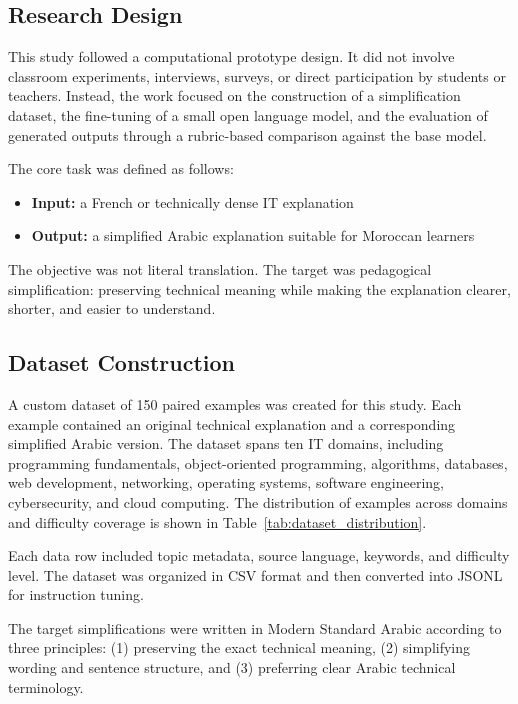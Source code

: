 \documentclass[education,article,submit,moreauthors]{Definitions/mdpi}
\begin{document}
\subsection{Research Design}

This study followed a computational prototype design. It did not involve classroom experiments, interviews, surveys, or direct participation by students or teachers. Instead, the work focused on the construction of a simplification dataset, the fine-tuning of a small open language model, and the evaluation of generated outputs through a rubric-based comparison against the base model.

The core task was defined as follows:

\begin{itemize}[leftmargin=1.5em]
    \item \textbf{Input:} a French or technically dense IT explanation
    \item \textbf{Output:} a simplified Arabic explanation suitable for Moroccan learners
\end{itemize}

The objective was not literal translation. The target was pedagogical simplification: preserving technical meaning while making the explanation clearer, shorter, and easier to understand.

\subsection{Dataset Construction}

A custom dataset of 150 paired examples was created for this study. Each example contained an original technical explanation and a corresponding simplified Arabic version. The dataset spans ten IT domains, including programming fundamentals, object-oriented programming, algorithms, databases, web development, networking, operating systems, software engineering, cybersecurity, and cloud computing. The distribution of examples across domains and difficulty coverage is shown in Table~\ref{tab:dataset_distribution}.

Each data row included topic metadata, source language, keywords, and difficulty level. The dataset was organized in CSV format and then converted into JSONL for instruction tuning.

The target simplifications were written in Modern Standard Arabic according to three principles: (1) preserving the exact technical meaning, (2) simplifying wording and sentence structure, and (3) preferring clear Arabic technical terminology.
\end{document}
